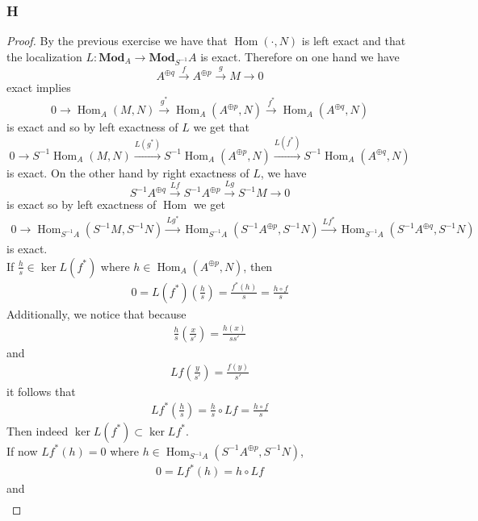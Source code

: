 \documentclass{article}
\newcommand{\Mod}{\mathbf{Mod}} %
\DeclareMathOperator{\Hom}{\mathrm{Hom}}
\begin{document}
\subsubsection{H}\label{1.6.H}
\begin{proof}
    By the previous exercise we have that $\Hom(\cdot,N)$ is left exact and that the localization $L:\Mod_A \to \Mod_{S^{-1}}A$ is exact. Therefore on one hand we have
    \[
    A^{\oplus q} \xrightarrow{f} A^{\oplus p}\xrightarrow{g} M\rightarrow 0
    \]
    exact implies
    \[
    0\rightarrow \Hom_A(M,N)\xrightarrow{g^*} \Hom_A(A^{\oplus p},N)\xrightarrow{f^*} \Hom_A(A^{\oplus q},N)
    \]
    is exact and so by left exactness of $L$ we get that
    \[
    0\rightarrow S^{-1}\Hom_A(M,N)\xrightarrow{L(g^*)} S^{-1}\Hom_A(A^{\oplus p},N) \xrightarrow{L(f^*)} S^{-1}\Hom_A(A^{\oplus q},N)
    \]
    is exact. On the other hand by right exactness of $L$, we have
    \[
    S^{-1}A^{\oplus q} \xrightarrow{Lf} S^{-1}A^{\oplus p} \xrightarrow{Lg} S^{-1}M \rightarrow0
    \]
    is exact so by left exactness of $\Hom$ we get
    \begin{align*}
        0\rightarrow \Hom_{S^{-1}A}(S^{-1}M,S^{-1}N) \xrightarrow{Lg^*} \Hom_{S^{-1}A}(S^{-1}A^{\oplus p},S^{-1}N)\xrightarrow{Lf^*} \Hom_{S^{-1}A}(S^{-1}A^{\oplus q},S^{-1}N)
    \end{align*}
    is exact.\\
    If $\frac{h}{s}\in \ker L(f^*)$ where $h\in \Hom_A(A^{\oplus p},N)$, then
    \begin{align*}
        0=L(f^*)(\frac{h}{s})=\frac{f^*(h)}{s}=\frac{h\circ f}{s}
    \end{align*}
    Additionally, we notice that because
    \begin{align*}
        \frac{h}{s}(\frac{x}{s'})=\frac{h(x)}{ss'}
    \end{align*}
    and
    \begin{align*}
        Lf(\frac{y}{s'})=\frac{f(y)}{s'}
    \end{align*}
    it follows that
    \begin{align*}
        Lf^*(\frac{h}{s})=\frac{h}{s}\circ Lf=\frac{h\circ f}{s}
    \end{align*}
    Then indeed $\ker L(f^*)\subset \ker Lf^*$.\\
    If now $Lf^*(h)=0$ where $h\in \Hom_{S^{-1}A}(S^{-1}A^{\oplus p},S^{-1}N)$,
    \begin{align*}
        0=Lf^*(h)=h\circ Lf
    \end{align*}
    and
    \begin{align*}

\end{align*}
\end{proof}
\end{document}
